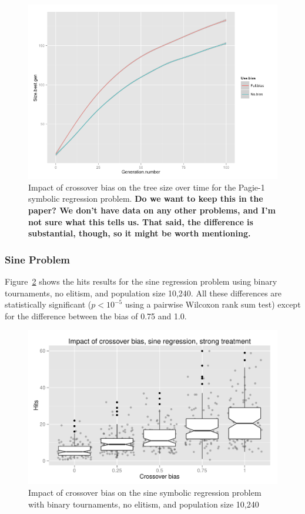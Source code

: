 \documentclass{sig-alternate}
\begin{document}
\begin{figure}
\centering
\includegraphics[width=0.45 \textwidth]{Plots/Pagie-1_size_vs_time.png}
\caption{Impact of crossover bias on the tree size over time for the Pagie-1 symbolic regression problem. \textbf{Do 
we want to keep this in the paper? We don't have data on any other problems, and I'm not sure what this tells us. That 
said, the difference is substantial, though, so it might be worth mentioning.}}
\label{fig:Pagie1SizeOverTime}
\end{figure}

\subsubsection{Sine Problem}

Figure~\ref{fig:sineBiasResultsStrong} shows the hits results for the sine regression problem using binary 
tournaments, no 
elitism, and population size 10,240. All these differences are statistically significant ($p < 10^{-5}$ using a 
pairwise Wilcoxon rank sum test) except for the difference between the bias of 0.75 and 1.0.

\begin{figure}
\centering
\includegraphics[width=0.45 \textwidth]{Plots/Sine_XO_impact_strong_boxplot.pdf}
\caption{Impact of crossover bias on the sine symbolic regression problem with binary tournaments, no elitism, and 
population size 10,240}
\label{fig:sineBiasResultsStrong}
\end{figure}

%
%
%
%
\end{document}
